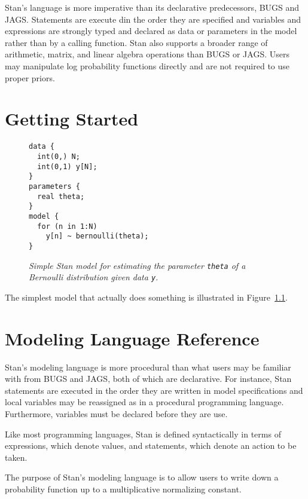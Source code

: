 \documentclass[11pt]{report}
\newcommand{\Stan}{Stan\xspace}
\newcommand{\code}[1]{{\tt #1}}
\newcommand{\mycaption}[2]{\caption{{\it #2}\label{#1.fig}}}
\newcommand{\reffig}[1]{Figure~\ref{#1.fig}}
\begin{document}
Stan's language is more imperative than its declarative
predecessors, BUGS and JAGS.  Statements are execute din the order
they are specified and variables and expressions are strongly typed
and declared as data or parameters in the model rather than by a
calling function.  Stan also supports a broader range of arithmetic,
matrix, and linear algebra operations than BUGS or JAGS.  Users may
manipulate log probability functions directly and are not required
to use proper priors.


\chapter{Getting Started}

\begin{figure}
\begin{center}
\begin{verbatim}
data {
  int(0,) N;
  int(0,1) y[N];
}
parameters {
  real theta;
}
model {
  for (n in 1:N)
    y[n] ~ bernoulli(theta);
}
\end{verbatim}
\end{center}
\mycaption{bernoulli-est}{Simple \Stan model for estimating the
  parameter \code{theta} of a Bernoulli distribution given data
  \code{y}.}
\end{figure}

The simplest model that actually does something is illustrated
in \reffig{bernoulli-est}.

\chapter{Modeling Language Reference}

\Stan's modeling language is more procedural than what users may be
familiar with from BUGS and JAGS, both of which are declarative.  For
instance, \Stan statements are executed in the order they are written
in model specifications and local variables may be reassigned as in a
procedural programming language.  Furthermore, variables must be
declared before they are use.  

Like most programming languages, \Stan is defined syntactically in
terms of expressions, which denote values, and statements, which
denote an action to be taken.

The purpose of \Stan's modeling language is to allow users to write
down a probability function up to a multiplicative normalizing
constant.  
\end{document}
